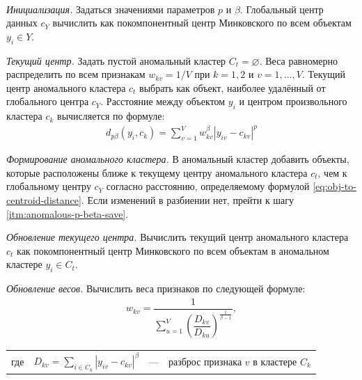 \documentclass[12pt]{a&t}
\begin{document}
\begin{algorithm} \label{alg:anomalous-p-beta}
	\
	\begin{enumlist}[.] 
		
		\item \textit{Инициализация.} Задаться значениями параметров $ p $ и $ \beta $. Глобальный центр данных $ c_Y $ вычислить как покомпонентный центр Минковского по всем объектам \mbox{$ y_i \in Y $.}
		
		\item \label{itm:anomalous-p-beta-tent-centroid} \textit{Текущий центр.} Задать пустой аномальный кластер $ C_t = \varnothing $. Веса равномерно распределить по всем признакам $ w_{kv} = 1/V $ при $ k=1,2 $ и $ v=1,\ldots,V $. Текущий центр аномального кластера $ c_t $ выбрать как объект, наиболее удалённый от глобального центра $ c_Y $. Расстояние между объектом $ y_i $ и центром произвольного кластера $ c_k $ вычисляется по формуле:
		\begin{gather} \label{eq:obj-to-centroid-distance}
			d_{p\beta}(y_i,c_k)=\sum_{v=1}^{V}w^\beta_{kv}|y_{iv}-c_{kv}|^p
		\end{gather}
		
		\item \textit{Формирование аномального кластера.} В аномальный кластер добавить объекты, которые расположены ближе к текущему центру аномального кластера $ c_t $, чем к глобальному центру $ c_Y $ согласно расстоянию, определяемому формулой \ref{eq:obj-to-centroid-distance}. Если изменений в разбиении нет, прейти к шагу \ref{itm:anomalous-p-beta-save}.
		
		\item \textit{Обновление текущего центра.} Вычислить текущий центр аномального кластера $ c_t $ как покомпонентный центр Минковского по всем объектам в аномальном кластере $ y_i \in C_t $.
		
		\item \textit{Обновление весов.} Вычислить веса признаков по следующей формуле:
		\begin{gather} \label{eq:weights}
			w_{kv}=\dfrac{1}{\sum_{u=1}^{V} \left ( \dfrac{D_{kv}}{D_{ku}} \right )^{\frac{1}{\beta-1}}},
		\end{gather}
		\begin{tabular}{llll}
			где & $D_{kv}=\sum_{i\in C_k}^{}|y_{iv}-c_{kv}|^\beta$ & {---} & разброс признака $ v $ в кластере $ C_k $ \\
		\end{tabular}
		

\end{enumlist}
\end{algorithm}
\end{document}
